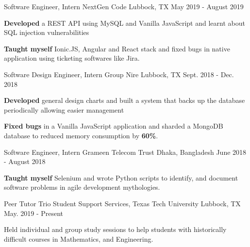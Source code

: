 
\begin{cventries}
    \cventry
    {Software Engineer, Intern} %
    {NextGen Code} %
    {Lubbock, TX} %
    {May 2019 - August 2019} %
    {
      \begin{cvitems} %
        \item { \textbf{Developed} a REST API using MySQL and Vanilla JavaScript and learnt about SQL injection vulnerabilities}
        \item { \textbf{Taught myself} Ionic.JS, Angular and React stack and fixed bugs in native application using ticketing softwares like Jira.}
      \end{cvitems}
    }
    
  \cventry
    {Software Design Engineer, Intern} %
    {Group Nire} %
    {Lubbock, TX} %
    {Sept. 2018 - Dec. 2018} %
    {
      \begin{cvitems} %
        \item { \textbf{Developed} general design charts and built a system that backs up the database periodically allowing easier management}
        \item { \textbf{Fixed bugs} in a Vanilla JavaScript application and sharded a MongoDB database to reduced memory consumption by \textbf{60\%}.}
      \end{cvitems}
    }
    
     \cventry
    {Software Engineer, Intern} %
    {Grameen Telecom Trust} %
    {Dhaka, Bangladesh} %
    {June 2018 - August 2018} %
    {
      \begin{cvitems} %
        \item { \textbf{Taught myself} Selenium and wrote Python scripts to identify, and document software problems in agile development mythologies.}
      \end{cvitems}
    }
    
    \cventry
    {Peer Tutor} %
    {Trio Student Support Services, Texas Tech University} %
    {Lubbock, TX} %
    {May. 2019 -  Present} %
    {
      \begin{cvitems} %
        \item {Held individual and group study sessions to help students with historically difficult courses in Mathematics, and Engineering.}
      \end{cvitems}
    }
    
\end{cventries}
